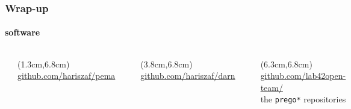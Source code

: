 \documentclass{beamer}
\begin{document}

   \begin{frame}
      \frametitle{Wrap-up}
      \framesubtitle{software}

      \begin{columns}[onlytextwidth]


            \includegraphics[width=25mm]{resources/pema_logo.png}

            \begin{textblock*}{3cm}(1.3cm,6.8cm)
               \tiny \href{https://github.com/hariszaf/pema}{github.com/hariszaf/pema}
            \end{textblock*}


            \includegraphics[width=25mm]{resources/darn_logo.png}
            \begin{textblock*}{3cm}(3.8cm,6.8cm)
               \tiny	 \href{https://github.com/hariszaf/darn}{github.com/hariszaf/darn}
            \end{textblock*}


            \includegraphics[width=25mm]{resources/prego_logo.png}
            \begin{textblock*}{3cm}(6.3cm,6.8cm)
               \tiny	 \href{https://github.com/lab42open-team}{github.com/lab42open-team/} \\
               \tiny the \texttt{prego*} repositories
            \end{textblock*}


\end{columns}
\end{frame}
\end{document}

